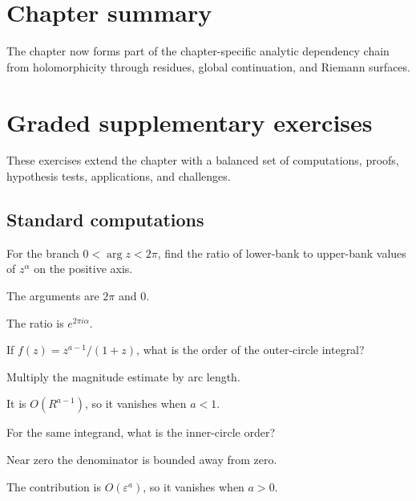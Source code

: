 \section*{Chapter summary}
The chapter now forms part of the chapter-specific analytic dependency chain from holomorphicity through residues, global continuation, and Riemann surfaces.
\section{Graded supplementary exercises}
These exercises extend the chapter with a balanced set of computations, proofs, hypothesis tests, applications, and challenges.

\subsection*{Standard computations}

\begin{exercise}\label{exr:iv21-expand-01}
For the branch \(0<\arg z<2\pi\), find the ratio of lower-bank to upper-bank values of \(z^\alpha\) on the positive axis.
\end{exercise}
\begin{hint}
The arguments are \(2\pi\) and \(0\).
\end{hint}
\begin{solution}
The ratio is \(e^{2\pi i\alpha}\).
\end{solution}

\begin{exercise}\label{exr:iv21-expand-02}
If \(f(z)=z^{a-1}/(1+z)\), what is the order of the outer-circle integral?
\end{exercise}
\begin{hint}
Multiply the magnitude estimate by arc length.
\end{hint}
\begin{solution}
It is \(O(R^{a-1})\), so it vanishes when \(a<1\).
\end{solution}

\begin{exercise}\label{exr:iv21-expand-03}
For the same integrand, what is the inner-circle order?
\end{exercise}
\begin{hint}
Near zero the denominator is bounded away from zero.
\end{hint}
\begin{solution}
The contribution is \(O(\varepsilon^a)\), so it vanishes when \(a>0\).
\end{solution}


